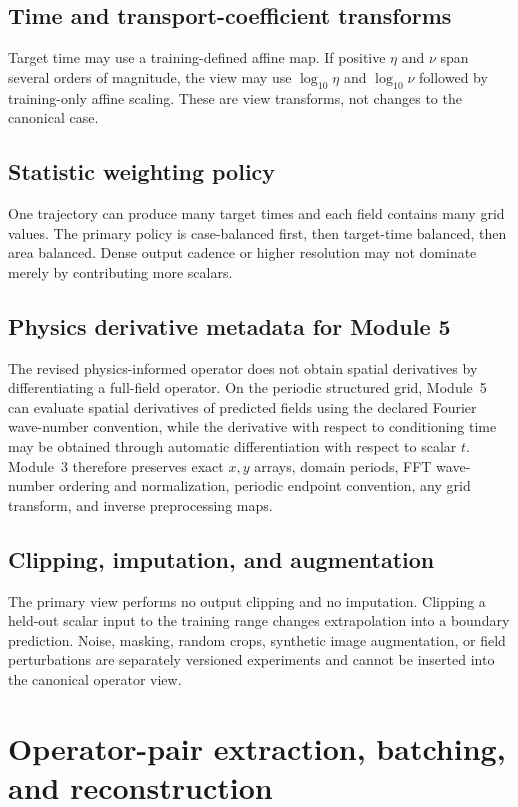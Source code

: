 \documentclass[11pt]{article}
\begin{document}
\subsection{Time and transport-coefficient transforms}
Target time may use a training-defined affine map. If positive $\eta$ and $\nu$ span several orders of magnitude, the view may use $\log_{10}\eta$ and $\log_{10}\nu$ followed by training-only affine scaling. These are view transforms, not changes to the canonical case.

\subsection{Statistic weighting policy}
One trajectory can produce many target times and each field contains many grid values. The primary policy is case-balanced first, then target-time balanced, then area balanced. Dense output cadence or higher resolution may not dominate merely by contributing more scalars.

\subsection{Physics derivative metadata for Module 5}
The revised physics-informed operator does not obtain spatial derivatives by differentiating a full-field operator. On the periodic structured grid, Module~5 can evaluate spatial derivatives of predicted fields using the declared Fourier wave-number convention, while the derivative with respect to conditioning time may be obtained through automatic differentiation with respect to scalar $t$. Module~3 therefore preserves exact $x,y$ arrays, domain periods, FFT wave-number ordering and normalization, periodic endpoint convention, any grid transform, and inverse preprocessing maps.

\subsection{Clipping, imputation, and augmentation}
The primary view performs no output clipping and no imputation. Clipping a held-out scalar input to the training range changes extrapolation into a boundary prediction. Noise, masking, random crops, synthetic image augmentation, or field perturbations are separately versioned experiments and cannot be inserted into the canonical operator view.

\section{Operator-pair extraction, batching, and reconstruction}
\label{sec:operator_pairs}
\end{document}
